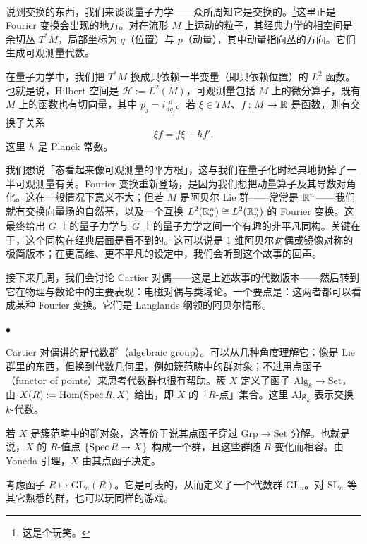 
说到交换的东西，我们来谈谈量子力学——众所周知它是交换的。\footnote{这是个玩笑。}这里正是 Fourier 变换会出现的地方。对在流形 $M$ 上运动的粒子，其经典力学的相空间是余切丛 $T^*M$，局部坐标为 $q$（位置）与 $p$（动量），其中动量指向丛的方向。它们生成可观测量代数。

在量子力学中，我们把 $T^*M$ 换成只依赖一半变量（即只依赖位置）的 $L^2$ 函数。也就是说，Hilbert 空间是 $\mathcal{H} := L^2(M)$，可观测量包括 $M$ 上的微分算子，既有 $M$ 上的函数也有切向量，其中 $p_j = i\frac{d}{dq_j}$。若 $\xi\in TM$、$f\colon M\to\mathbb{R}$ 是函数，则有交换子关系
\[
  \xi f = f\xi + \hbar f'.
\]
这里 $\hbar$ 是 Planck 常数。

我们想说「态看起来像可观测量的平方根」，这与我们在量子化时经典地扔掉了一半可观测量有关。Fourier 变换重新登场，是因为我们想把动量算子及其导数对角化。这在一般情况下意义不大；但若 $M$ 是阿贝尔 Lie 群——常常是 $\mathbb{R}^n$——我们就有交换向量场的自然基，以及一个互换 $L^2(\mathbb{R}^n_q)\cong L^2(\mathbb{R}^n_p)$ 的 Fourier 变换。这最终给出 $G$ 上的量子力学与 $\widehat{G}$ 上的量子力学之间一个有趣的非平凡同构。关键在于，这个同构在经典层面是看不到的。这可以说是 $1$ 维阿贝尔对偶或镜像对称的极简版本；在更高维、更不平凡的设定中，我们会听到这个故事的回声。

接下来几周，我们会讨论 Cartier 对偶——这是上述故事的代数版本——然后转到它在物理与数论中的主要表现：电磁对偶与类域论。一个要点是：这两者都可以看成某种 Fourier 变换。它们是 Langlands 纲领的阿贝尔情形。

\begin{center}$\bullet$\end{center}

Cartier 对偶讲的是代数群（algebraic group）。可以从几种角度理解它：像是 Lie 群里的东西，但换到代数几何里，例如簇范畴中的群对象；不过用点函子（functor of points）来思考代数群也很有帮助。簇 $X$ 定义了函子 $\mathrm{Alg}_k\to\mathrm{Set}$，由 $X(R) := \operatorname{Hom}(\operatorname{Spec} R, X)$ 给出，即 $X$ 的「$R$-点」集合。这里 $\mathrm{Alg}_k$ 表示交换 $k$-代数。

若 $X$ 是簇范畴中的群对象，这等价于说其点函子穿过 $\mathrm{Grp}\to\mathrm{Set}$ 分解。也就是说，$X$ 的 $R$-值点 $\{\operatorname{Spec} R\to X\}$ 构成一个群，且这些群随 $R$ 变化而相容。由 Yoneda 引理，$X$ 由其点函子决定。

\begin{example}
  考虑函子 $R\mapsto \mathrm{GL}_n(R)$。它是可表的，从而定义了一个代数群 $\mathrm{GL}_n$。对 $\mathrm{SL}_n$ 等其它熟悉的群，也可以玩同样的游戏。
\end{example}

